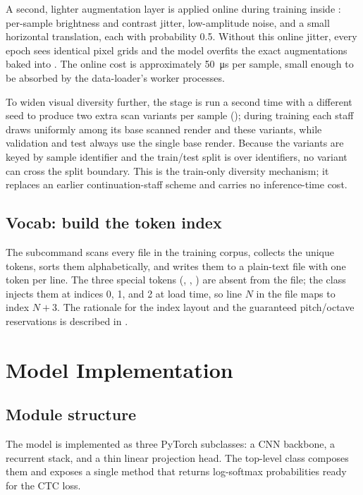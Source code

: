 A second, lighter augmentation layer is applied online during training
inside : per-sample brightness and
contrast jitter, low-amplitude noise, and a small horizontal
translation, each with probability \num{0.5}.
Without this online jitter, every epoch sees identical pixel grids and
the model overfits the exact augmentations baked into
.
The online cost is approximately \SI{50}{\micro\second} per sample,
small enough to be absorbed by the data-loader's worker processes.

To widen visual diversity further, the  stage is run a
second time with a different seed to produce two extra scan variants
per sample (); during training each staff
draws uniformly among its base scanned render and these variants, while
validation and test always use the single base render.
Because the variants are keyed by sample identifier and the train/test
split is over identifiers, no variant can cross the split boundary.
This is the train-only diversity mechanism; it replaces an earlier
continuation-staff scheme and carries no inference-time cost.

\subsection{Vocab: build the token index}

The  subcommand scans every  file in the
training corpus, collects the unique tokens, sorts them
alphabetically, and writes them to a plain-text file with one token
per line.
The three special tokens (, , )
are absent from the file; the  class injects them at
indices 0, 1, and 2 at load time, so line $N$ in the file maps to
index $N+3$.
The rationale for the index layout and the guaranteed pitch/octave
reservations is described in .

\section{Model Implementation}
\label{sec:impl-model}

\subsection{Module structure}

The model is implemented as three PyTorch  subclasses:
a CNN backbone, a recurrent stack, and a thin linear projection head.
The top-level  class composes them and exposes a single
 method that returns log-softmax
probabilities ready for the CTC loss.

